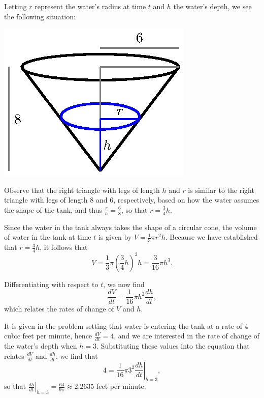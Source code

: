 \begin{activitySolution}
\ba
	\item Letting $r$ represent the water's radius at time $t$ and $h$ the water's depth, we see the following situation:
	\begin{center}
	\includegraphics{figures/3_5_Act1Soln.eps}
	\end{center}
	\item Observe that the right triangle with legs of length $h$ and $r$ is similar to the right triangle with legs of length $8$ and $6$, respectively, based on how the water assumes the shape of the tank, and thus $\frac{r}{h} = \frac{6}{8}$, so that $r = \frac{3}{4}h$.
	\item Since the water in the tank always takes the shape of a circular cone, the volume of water in the tank at time $t$ is given by $V = \frac{1}{3}\pi r^2 h$.  Because we have established that $r = \frac{3}{4}h$, it follows that
	$$V = \frac{1}{3}\pi \left( \frac{3}{4}h \right)^2 h = \frac{3}{16} \pi h^3.$$ 
	\item Differentiating with respect to $t$, we now find
	$$\frac{dV}{dt} = \frac{1}{16} \pi h^2 \frac{dh}{dt},$$
	which relates the rates of change of $V$ and $h$.
	\item It is given in the problem setting that water is entering the tank at a rate of 4 cubic feet per minute, hence $\frac{dV}{dt} = 4$, and we are interested in the rate of change of the water's depth when $h = 3$.  Substituting these values into the equation that relates $\frac{dV}{dt}$ and $\frac{dh}{dt}$, we find that
	$$4 =  \frac{1}{16} \pi 3^2 \left. \frac{dh}{dt} \right|_{h=3},$$
	so that $\left. \frac{dh}{dt} \right|_{h=3} = \frac{64}{9\pi} \approx 2.2635$ feet per minute.
\ea
\end{activitySolution}
\aftera
